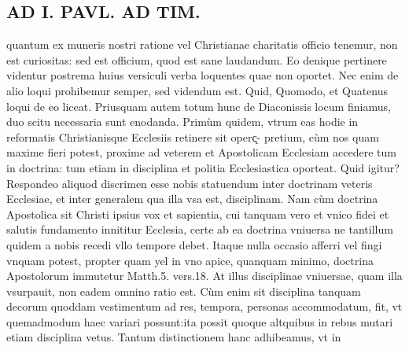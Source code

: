 \documentclass{article}
\begin{document}
\begin{pages}
\section*{AD I. PAVL. AD TIM. }
\marginpar{[ p.286 ]}\pstart quantum ex muneris nostri ratione vel Christianae charitatis officio tenemur, non est curiositas: sed est officium, quod est sane laudandum. Eo denique pertinere videntur postrema huius versiculi verba loquentes quae non oportet. Nec enim de alio loqui prohibemur semper, sed videndum est. Quid, Quomodo, et Quatenus loqui de eo liceat.  \pend\pstart Priusquam autem totum hunc de Diaconissis locum finiamus, duo scitu necessaria sunt enodanda. Primùm quidem, vtrum eas hodie in reformatis Christianisque Ecclesiis retinere sit operc̨- pretium, cùm nos quam maxime fieri potest, proxime ad veterem et Apostolicam Ecclesiam accedere tum in doctrina: tum etiam in disciplina et politia Ecclesiastica oporteat. Quid igitur? Respondeo aliquod discrimen esse nobis statuendum inter doctrinam veteris Ecclesiae, et inter generalem qua illa vsa est, disciplinam. Nam cùm doctrina Apostolica sit Christi ipsius vox et sapientia, cui tanquam vero et vnico fidei et salutis fundamento innititur Ecclesia, certe ab ea doctrina vniuersa ne tantillum quidem a nobis recedi vllo tempore debet. Itaque nulla occasio afferri vel fingi vnquam potest, propter quam yel in vno apice, quanquam minimo, doctrina Apostolorum immutetur Matth.5. vers.18. At illus disciplinae vniuersae, quam illa vsurpauit, non eadem omnino ratio est. Cùm enim sit disciplina tanquam decorum quoddam vestimentum ad res, tempora, personas accommodatum, fit, vt quemadmodum haec variari possunt:ita possit quoque altquibus in rebus mutari etiam disciplina vetus. Tantum distinctionem hanc adhibeamus, vt in  \pend

\end{pages}
\end{document}
